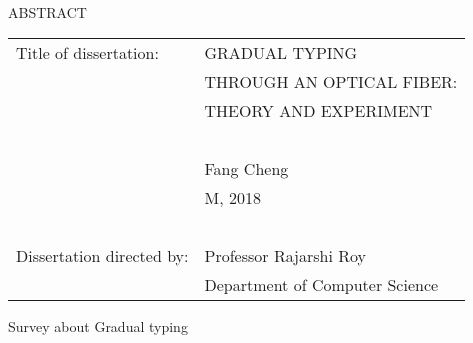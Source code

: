 
\hbox{\ }

\renewcommand{\baselinestretch}{1}
\small \normalsize

\begin{center}
\large{{ABSTRACT}}

\vspace{3em}

\end{center}
\hspace{-.15in}
\begin{tabular}{ll}
Title of dissertation:    & {\large  GRADUAL TYPING }\\
&                     {\large  THROUGH AN OPTICAL FIBER:} \\
&                     {\large  THEORY AND EXPERIMENT} \\
\ \\
&                          {\large  Fang Cheng} \\
&                           {\large M, 2018} \\
\ \\
Dissertation directed by: & {\large  Professor Rajarshi Roy} \\
&               {\large  Department of Computer Science } \\
\end{tabular}

\vspace{3em}

\renewcommand{\baselinestretch}{2}
\large \normalsize

Survey about Gradual typing
